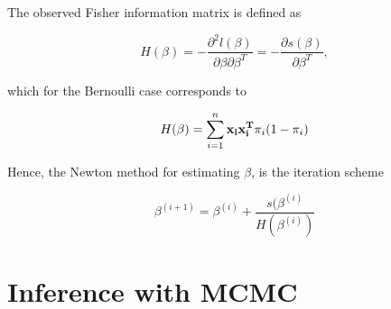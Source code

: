 The observed Fisher information matrix is defined as 

\begin{equation}
    H(\beta) = - \frac{\partial^2 l(\beta)}{\partial \beta \partial \beta^T} = -\frac{\partial s(\beta)}{\partial \beta^T},
\end{equation}

which for the Bernoulli case corresponds to

\begin{equation}
    H(\beta) = \sum_{i=1}^{n} {\bf x_i x_i^T} \pi_i (1-\pi_i)
\end{equation}

Hence, the Newton method for estimating $\beta$, is the iteration scheme

\begin{equation}
\label{eq:Newton}
    \beta^{(i+1)} = \beta^{(i)} + \frac{s(\beta^{(i)}}{H(\beta^{(i)})}
\end{equation}









\section{Inference with MCMC}
\label{Bayesian}

